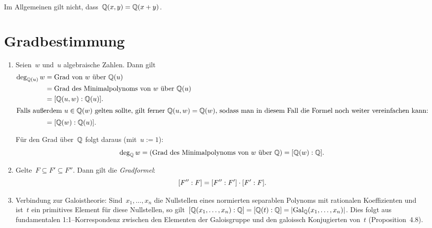 \documentclass{../../algblatt}
\begin{document}
Im Allgemeinen gilt nicht, dass~$\mathbb{Q}(x,y) = \mathbb{Q}(x+y)$.


\section*{Gradbestimmung}

\begin{enumerate}
\item Seien~$w$ und~$u$ algebraische Zahlen. Dann gilt
\begin{align*}
  \deg_{\mathbb{Q}(u)} w &= \text{Grad von~$w$ über~$\mathbb{Q}(u)$} \\
  &= \text{Grad des Minimalpolynoms von~$w$ über~$\mathbb{Q}(u)$} \\
  &= [\mathbb{Q}(u,w):\mathbb{Q}(u)]. \\
\intertext{Falls außerdem~$u \in \mathbb{Q}(w)$ gelten sollte, gilt ferner~$\mathbb{Q}(u,w) =
\mathbb{Q}(w)$, sodass man in diesem Fall die Formel noch weiter vereinfachen kann:}
  &= [\mathbb{Q}(w):\mathbb{Q}(u)].
\end{align*}

Für den Grad über~$\mathbb{Q}$ folgt daraus (mit~$u := 1$):
\[ \deg_{\mathbb{Q}} w =
  \text{(Grad des Minimalpolynoms von~$w$ über~$\mathbb{Q}$)} =
  [\mathbb{Q}(w):\mathbb{Q}]. \]

\item Gelte~$F \subseteq F' \subseteq F''$. Dann gilt die \emph{Gradformel}:
\[ [F'':F] = [F'':F'] \cdot [F':F]. \]

\item Verbindung zur Galoistheorie: Sind~$x_1,\ldots,x_n$ die Nullstellen
eines normierten separablen Polynoms mit rationalen Koeffizienten und ist~$t$
ein primitives Element für diese Nullstellen, so
gilt~$[\mathbb{Q}(x_1,\ldots,x_n):\mathbb{Q}] = [\mathbb{Q}(t):\mathbb{Q}] =
|\mathrm{Gal}_{\mathbb{Q}}(x_1,\ldots,x_n)|$. Dies folgt aus fundamentalen
1:1--Korrespondenz zwischen den Elementen der Galoisgruppe und den galoissch
Konjugierten von~$t$ (Proposition~4.8).
\end{enumerate}
\end{document}
